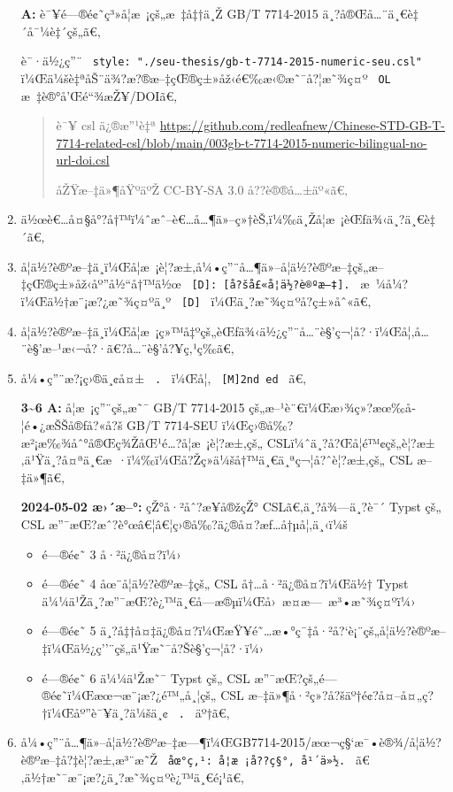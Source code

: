 \begin{enumerate}
  \textbf{A:} è¯¥é---®é¢˜ç³»å­¦æ~¡çš„æ~‡å‡†ä¸Ž GB/T 7714-2015
  ä¸?å®Œå\ldots¨ä¸€è‡´å¯¼è‡´çš„ã€‚

  è¯·ä½¿ç''¨
  \texttt{\ style:\ "./seu-thesis/gb-t-7714-2015-numeric-seu.csl"\ }
  ï¼Œä¼šè‡ªåŠ¨ä¾?æ?®æ--‡çŒ®ç±»åž‹é€‰æ‹©æ˜¯å?¦æ˜¾ç¤º \texttt{\ OL\ }
  æ~‡è®°å'Œé``¾æŽ¥/DOIã€‚

  \begin{quote}
  è¯¥ csl ä¿®æ''¹è‡ª
  \url{https://github.com/redleafnew/Chinese-STD-GB-T-7714-related-csl/blob/main/003gb-t-7714-2015-numeric-bilingual-no-url-doi.csl}

  åŽŸæ--‡ä»¶åŸºäºŽ CC-BY-SA 3.0 å??è®®å\ldots±äº«ã€‚
  \end{quote}
\item
  ä½œè€\ldots å¤§å°?å†™ï¼ˆæˆ--è€\ldots å\ldots¶ä»--ç»†èŠ‚ï¼‰ä¸Žå­¦æ~¡èŒƒä¾‹ä¸?ä¸€è‡´ã€‚
\item
  å­¦ä½?è®ºæ--‡ä¸­ï¼Œå­¦æ~¡è¦?æ±‚å¼•ç''¨å\ldots¶ä»--å­¦ä½?è®ºæ--‡çš„æ--‡çŒ®ç±»åž‹åº''å½``å†™ä½œ
  \texttt{\ {[}D{]}:\ {[}å?šå£«å­¦ä½?è®ºæ–‡{]}.\ }
  æ~¼å¼?ï¼Œä½†æ¨¡æ?¿æ˜¾ç¤ºä¸º \texttt{\ {[}D{]}\ }
  ï¼Œä¸?æ˜¾ç¤ºå­?ç±»åˆ«ã€‚
\item
  å­¦ä½?è®ºæ--‡ä¸­ï¼Œå­¦æ~¡ç»™å‡ºçš„èŒƒä¾‹ä½¿ç''¨å\ldots¨è§'ç¬¦å?·ï¼Œå¦‚å\ldots¨è§'æ--¹æ‹¬å?·ã€?å\ldots¨è§'å?¥ç‚¹ç­‰ã€‚
\item
  å¼•ç''¨æ?¡ç›®ä¸¢å¤± \texttt{\ .\ } ï¼Œå¦‚ \texttt{\ {[}M{]}2nd\ ed\ }
  ã€‚

  \textbf{3\textasciitilde6 A:} å­¦æ~¡ç''¨çš„æ˜¯ GB/T 7714-2015
  çš„æ--¹è¨€ï¼Œæ›¾ç»?æœ‰å­¦é•¿æŠŠå®ƒå?«å?š GB/T 7714-SEU
  ï¼Œç›®å‰?æ²¡æ‰¾åˆ°å®Œç¾ŽåŒ¹é\ldots?å­¦æ~¡è¦?æ±‚çš„
  CSLï¼ˆä¸?å?Œå­¦é™¢çš„è¦?æ±‚ä¹Ÿä¸?å¤ªä¸€æ~·ï¼‰ï¼Œå?Žç»­ä¼šå†™ä¸€ä¸ªç¬¦å?ˆè¦?æ±‚çš„
  CSL æ--‡ä»¶ã€‚

  \textbf{2024-05-02 æ›´æ--°:} çŽ°å·²åˆ?æ­¥å®žçŽ° CSLã€‚ä¸?å¾---ä¸?è¯´
  Typst çš„ CSL æ''¯æŒ?æˆ?è°œâ€¦â€¦ç›®å‰?ä¿®å¤?æƒ\ldots å†µå¦‚ä¸‹ï¼š

  \begin{itemize}
  \tightlist
  \item
    é---®é¢˜ 3 å·²ä¿®å¤?ï¼›
  \item
    é---®é¢˜ 4 åœ¨å­¦ä½?è®ºæ--‡çš„ CSL å†\ldots å·²ä¿®å¤?ï¼Œä½† Typst
    ä¼¼ä¹Žä¸?æ''¯æŒ?è¿™ä¸€å­---æ®µï¼Œå›~æ­¤æ---~æ³•æ˜¾ç¤ºï¼›
  \item
    é---®é¢˜ 5
    ä¸?å‡†å¤‡ä¿®å¤?ï¼ŒæŸ¥é˜\ldots æ•°ç¯‡å·²å?{}`è¡¨çš„å­¦ä½?è®ºæ--‡ï¼Œä½¿ç''¨çš„ä¹Ÿæ˜¯å?Šè§'ç¬¦å?·ï¼›
  \item
    é---®é¢˜ 6 ä¼¼ä¹Žæ˜¯ Typst çš„ CSL
    æ''¯æŒ?çš„é---®é¢˜ï¼Œæœ¬æ¨¡æ?¿é™„å¸¦çš„ CSL
    æ--‡ä»¶å·²ç»?å?šäº†é¢?å¤--å¤„ç?†ï¼Œåº''è¯¥ä¸?ä¼šä¸¢ \texttt{\ .\ }
    äº†ã€‚
  \end{itemize}
\item
  å¼•ç''¨å\ldots¶ä»--å­¦ä½?è®ºæ--‡æ---¶ï¼ŒGB7714-2015/æœ¬ç§`æ¯•è®¾/å­¦ä½?è®ºæ--‡å?‡è¦?æ±‚æ³¨æ˜Ž
  \texttt{\ åœ°ç‚¹:\ å­¦æ~¡å??ç§°,\ å¹´ä»½.\ }
  ã€‚ä½†æ˜¯æ¨¡æ?¿ä¸?æ˜¾ç¤ºè¿™ä¸€é¡¹ã€‚


\end{enumerate}
